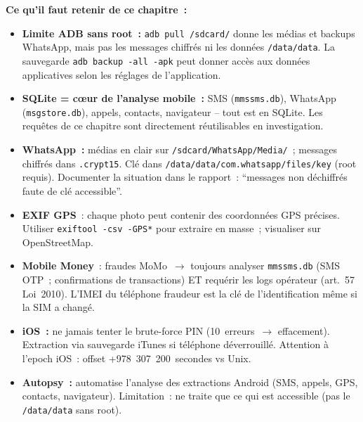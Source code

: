 \separateur

\begin{boxresume}
\textbf{Ce qu'il faut retenir de ce chapitre~:}
\begin{itemize}
    \item \textbf{Limite ADB sans root~:} \texttt{adb pull /sdcard/}
          donne les médias et backups WhatsApp, mais pas les messages
          chiffrés ni les données \texttt{/data/data}. La sauvegarde
          \texttt{adb backup -all -apk} peut donner accès aux données
          applicatives selon les réglages de l'application.

    \item \textbf{SQLite = c\oe ur de l'analyse mobile~:} SMS
          (\texttt{mmssms.db}), WhatsApp (\texttt{msgstore.db}),
          appels, contacts, navigateur -- tout est en SQLite.
          Les requêtes de ce chapitre sont directement réutilisables
          en investigation.

    \item \textbf{WhatsApp~:} médias en clair sur \texttt{/sdcard/WhatsApp/Media/}~;
          messages chiffrés dans \texttt{.crypt15}. Clé dans
          \texttt{/data/data/com.whatsapp/files/key} (root requis).
          Documenter la situation dans le rapport~: ``messages non
          déchiffrés faute de clé accessible''.

    \item \textbf{EXIF GPS}~: chaque photo peut contenir des
          coordonnées GPS précises. Utiliser \texttt{exiftool -csv -GPS*}
          pour extraire en masse~; visualiser sur OpenStreetMap.

    \item \textbf{Mobile Money}~: fraudes MoMo~$\to$ toujours
          analyser \texttt{mmssms.db} (SMS OTP~; confirmations
          de transactions) ET requérir les logs opérateur
          (art.~57 Loi~2010). L'IMEI du téléphone fraudeur
          est la clé de l'identification même si la SIM a changé.

    \item \textbf{iOS~:} ne jamais tenter le brute-force PIN
          (10~erreurs~$\to$ effacement). Extraction via sauvegarde
          iTunes si téléphone déverrouillé. Attention à l'epoch
          iOS~: offset +978~307~200~secondes vs Unix.

    \item \textbf{Autopsy~:} automatise l'analyse des extractions
          Android (SMS, appels, GPS, contacts, navigateur). Limitation~:
          ne traite que ce qui est accessible (pas le \texttt{/data/data}
          sans root).
\end{itemize}
\end{boxresume}

